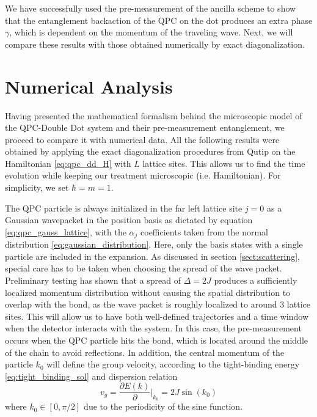 \documentclass{article}
\begin{document}
We have successfully used the pre-measurement of the ancilla scheme to show that the
entanglement backaction of the QPC on the dot produces an extra phase $\gamma$, which is dependent 
on the momentum of the traveling wave. 
Next, we will compare these results with those obtained numerically by exact 
diagonalization. 


\section{Numerical Analysis}\label{sect:numerical_analysis}

Having presented the mathematical formalism behind the microscopic model of the QPC-Double Dot system
and their pre-measurement entanglement, we proceed to compare it with numerical data. All the following results were obtained by applying the exact diagonalization procedures from Qutip 
on the Hamiltonian \eqref{eq:qpc_dd_H} with $L$ lattice sites. 
This allows us to find the time evolution
while keeping our treatment microscopic (i.e. Hamiltonian). For simplicity, we set $\hbar = m =1$.

The QPC particle is always initialized in the far left lattice site $j=0$ as a Gaussian wavepacket
in the position basis as dictated by equation \eqref{eq:qpc_gauss_lattice}, with the $\alpha_j$
coefficients taken from the normal distribution \eqref{eq:gaussian_distribution}. Here,
only the basis states with a single particle are included in the expansion. As discussed in section
\ref{sect:scattering}, special care has to be taken when choosing the spread of the wave packet. 
Preliminary testing has shown that a spread of $\Delta =2 J$ produces a sufficiently localized 
momentum distribution without causing the spatial distribution to overlap with the bond, as the 
wave packet is roughly localized to around 3 lattice sites. This will allow us to have both well-defined trajectories and a time window when the detector interacts with the 
system. In this case, 
the pre-measurement occurs when the QPC particle hits the bond, which is located around the
middle of the chain to avoid reflections. 
In addition, the central momentum of the particle $k_0$ will define the
group velocity, according to the tight-binding energy \eqref{eq:tight_binding_sol} and 
dispersion relation
\begin{equation}
    v_g = \frac{\partial E(k)}{\partial}\Big|_{k_0} = 2 J \sin(k_0)
\end{equation}
where $k_0\in[0,\pi/2]$ due to the periodicity of the sine function.
\end{document}
